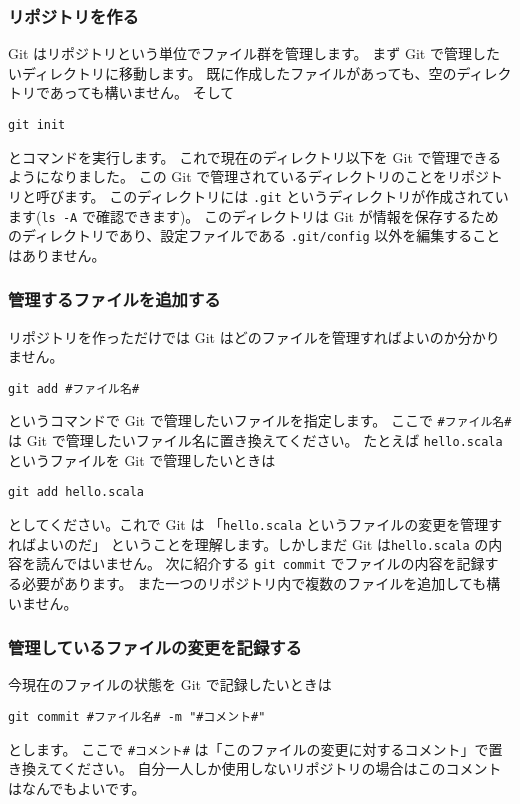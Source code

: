 \documentclass[a4paper]{article}
\begin{document}
\subsubsection{リポジトリを作る}
Git はリポジトリという単位でファイル群を管理します。
まず Git で管理したいディレクトリに移動します。
既に作成したファイルがあっても、空のディレクトリであっても構いません。
そして
\begin{verbatim}
git init
\end{verbatim}
とコマンドを実行します。
これで現在のディレクトリ以下を Git で管理できるようになりました。
この Git で管理されているディレクトリのことをリポジトリと呼びます。
このディレクトリには \texttt{.git} というディレクトリが作成されています(\texttt{ls -A} で確認できます)。
このディレクトリは Git が情報を保存するためのディレクトリであり、設定ファイルである \texttt{.git/config} 以外を編集することはありません。

\subsubsection{管理するファイルを追加する}
リポジトリを作っただけでは Git はどのファイルを管理すればよいのか分かりません。
\begin{verbatim}
git add #ファイル名#
\end{verbatim}
というコマンドで Git で管理したいファイルを指定します。
ここで \texttt{\#ファイル名\#}は Git で管理したいファイル名に置き換えてください。
たとえば \texttt{hello.scala} というファイルを Git で管理したいときは
\begin{verbatim}
git add hello.scala
\end{verbatim}
としてください。これで Git は 「\texttt{hello.scala} というファイルの変更を管理すればよいのだ」
ということを理解します。しかしまだ Git は\texttt{hello.scala} の内容を読んではいません。
次に紹介する \texttt{git commit} でファイルの内容を記録する必要があります。
また一つのリポジトリ内で複数のファイルを追加しても構いません。


\subsubsection{管理しているファイルの変更を記録する}
今現在のファイルの状態を Git で記録したいときは
\begin{verbatim}
git commit #ファイル名# -m "#コメント#"
\end{verbatim}
とします。
ここで \texttt{\#コメント\#} は「このファイルの変更に対するコメント」で置き換えてください。
自分一人しか使用しないリポジトリの場合はこのコメントはなんでもよいです。
\end{document}
